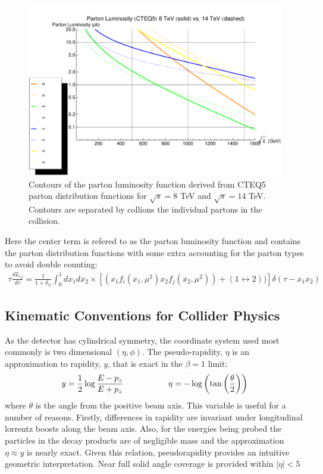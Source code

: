 \begin{figure}
\begin{center}
\includegraphics[width=.95\textwidth]{pics/parton_lumi_8TeV_14TeV}
\end{center}
\caption{Contours of the parton luminosity function derived from CTEQ5 parton distribution functions for $\sqrt{s}=8$ TeV and
$\sqrt{s}=14$ TeV. Contours are separated by collions the individual partons in the collision.  }
\label{fig:deltaRcones}
\end{figure}

Here the center term is refered to as the parton luminosity function and contains the parton distribution functions with
some extra accounting for the parton types to avoid double counting:
\begin{align*}
\tau\frac{dL_{ij}}{d\tau} = \frac{1}{1+\delta_{ij}} \int_0^1 dx_1 dx_2 \times \left [ (x_1 f_i(x_1,\mu^2) x_2 f_j(x_2,\mu^2)) + (1 \leftrightarrow 2)) \right ] \delta(\tau - x_1x_2) 
\end{align*}

\subsection{Kinematic Conventions for Collider Physics} 

 As the detector has cylindrical symmetry, the coordinate system used most
 commonly is two dimensional $(\eta, \phi)$. The pseudo-rapidity, $\eta$ is an approximation to rapidity, $y$, that is exact in the $\beta = 1$ limit:
\begin{align*}
y = \frac{1}{2}\log \frac{E - p_z}{E+p_z}\hspace{.75in} \eta = - \log \left( \tan\left (\frac{\theta}{2} \right ) \right)  
\end{align*}
where $\theta$ is the angle from the positive beam axis. This variable is useful for a number of reasons. 
Firstly, differences in rapidity are invariant under longitudinal lorrentz boosts along the beam axis. Also, 
for the energies being probed the particles in the decay products are of negligible mass and the approximation
 $\eta \approx y$ is nearly exact. Given this relation, pseudorapidity provides an intuitive geometric interpretation. 
Near full solid angle coverage is provided within $|\eta| < 5$


